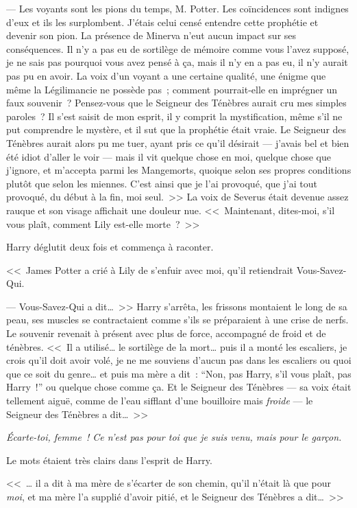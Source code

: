 --- Les voyants sont les pions du temps, M. Potter. Les coïncidences sont indignes d'eux et ils les surplombent. J'étais celui censé entendre cette prophétie et devenir son pion. La présence de Minerva n'eut aucun impact sur ses conséquences. Il n'y a pas eu de sortilège de mémoire comme vous l'avez supposé, je ne sais pas pourquoi vous avez pensé à ça, mais il n'y en a pas eu, il n'y aurait pas pu en avoir. La voix d'un voyant a une certaine qualité, une énigme que même la Légilimancie ne possède pas~; comment pourrait-elle en imprégner un faux souvenir~? Pensez-vous que le Seigneur des Ténèbres aurait cru mes simples paroles~? Il s'est saisit de mon esprit, il y comprit la mystification, même s'il ne put comprendre le mystère, et il sut que la prophétie était vraie. Le Seigneur des Ténèbres aurait alors pu me tuer, ayant pris ce qu'il désirait — j'avais bel et bien été idiot d'aller le voir — mais il vit quelque chose en moi, quelque chose que j'ignore, et m'accepta parmi les Mangemorts, quoique selon ses propres conditions plutôt que selon les miennes. C'est ainsi que je l'ai provoqué, que j'ai tout provoqué, du début à la fin, moi seul.~>> La voix de Severus était devenue assez rauque et son visage affichait une douleur nue. <<~Maintenant, dites-moi, s'il vous plaît, comment Lily est-elle morte~?~>>

Harry déglutit deux fois et commença à raconter.

<<~James Potter a crié à Lily de s'enfuir avec moi, qu'il retiendrait Vous-Savez-Qui.

--- Vous-Savez-Qui a dit…~>> Harry s'arrêta, les frissons montaient le long de sa peau, ses muscles se contractaient comme s'ils se préparaient à une crise de nerfs. Le souvenir revenait à présent avec plus de force, accompagné de froid et de ténèbres. <<~Il a utilisé… le sortilège de la mort… puis il a monté les escaliers, je crois qu'il doit avoir volé, je ne me souviens d'aucun pas dans les escaliers ou quoi que ce soit du genre… et puis ma mère a dit~: “Non, pas Harry, s'il vous plaît, pas Harry~!” ou quelque chose comme ça. Et le Seigneur des Ténèbres — sa voix était tellement aiguë, comme de l'eau sifflant d'une bouilloire mais \emph{froide} — le Seigneur des Ténèbres a dit…~>>

\emph{Écarte-toi, femme~! Ce n'est pas pour toi que je suis venu, mais pour le garçon.}

Le mots étaient très clairs dans l'esprit de Harry.

<<~… il a dit à ma mère de s'écarter de son chemin, qu'il n'était là que pour \emph{moi}, et ma mère l'a supplié d'avoir pitié, et le Seigneur des Ténèbres a dit…~>>

